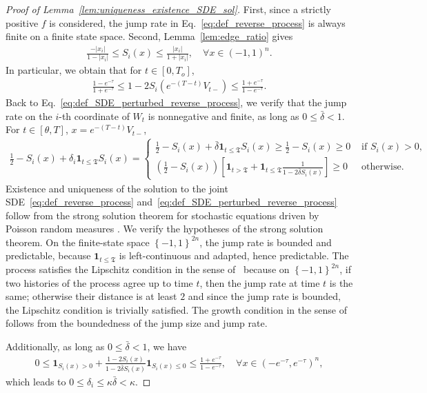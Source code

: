 \documentclass[11pt]{article}
\newcommand{\btau}{\kappa}
\newcommand{\bdelta}{\bar{\delta}}
\newcommand{\stopT}{{\boldsymbol{\mathfrak{T}}}}
\newcommand{\uV}{V}
\newcommand{\uW}{W}
\newcommand{\To}{{T_o}}
\theoremstyle{named}
\theoremstyle{plain}
\newcommand{\brackets}[1]{\left[ #1 \right]}
\newcommand{\parenth}[1]{\left( #1 \right)}
\newcommand{\braces}[1]{\left\{ #1 \right \}}
\newcommand{\abss}[1]{\left| #1 \right |}
\begin{document}
\begin{proof}[Proof of Lemma~\ref{lem:uniqueness_existence_SDE_sol}]
  First, since a strictly positive $f$ is considered, the jump rate in Eq.~\eqref{eq:def_reverse_process} is always finite on a finite state space. Second, Lemma~\ref{lem:edge_ratio} gives
\begin{align}
  \label{eq:score_bound}
  \frac{-\abss{x_i}}{1-\abss{x_i}} \leq S_i(x) \leq  \frac{\abss{x_i}}{1+\abss{x_i}}, \quad \forall x \in (-1, 1)^n.
\end{align}
In particular, we obtain that for $t \in [0, \To]$, 
\begin{align*}
  \frac{1-e^{-\tau}}{1+e^{-\tau}} \leq 1 - 2 S_i(e^{-(T-t)} \uV_{t-}) \leq \frac{1+e^{-\tau}}{1-e^{-\tau}}.
\end{align*}
Back to Eq.~\eqref{eq:def_SDE_perturbed_reverse_process}, we verify that the jump rate on the $i$-th coordinate of $\uW_t$ is nonnegative and finite, as long as $0 \leq \bdelta < 1$. For $t\in [\theta,T]$, $x = e^{-(T-t)} \uV_{t-}$,
\begin{align*}
  \frac{1}{2} - S_i(x) + \delta_i \mathbf{1}_{t \leq \stopT} S_i(x) = 
  \begin{cases}
    \displaystyle \frac{1}{2} - S_i(x) + \bdelta \mathbf{1}_{t \leq \stopT} S_i(x) \geq \frac{1}{2} - S_i(x) \geq 0 & \text{ if } S_i(x) > 0, \\
    \displaystyle \parenth{\frac{1}{2} - S_i(x)} \brackets{\mathbf{1}_{t > \stopT} + \mathbf{1}_{t \leq \stopT}\frac{1}{1-2\bdelta S_i(x)} }  \geq 0 & \text{ otherwise}.
  \end{cases}
\end{align*}
Existence and uniqueness of the solution to the joint SDE~\eqref{eq:def_reverse_process} and~\eqref{eq:def_SDE_perturbed_reverse_process} follow from the strong solution theorem for stochastic equations driven by Poisson random measures \cite[Chapter XIV, Definition 14.5 and Theorem 14.23]{jacod1979calcul}. We verify the hypotheses of the strong solution theorem. On the finite-state space $\braces{-1,1}^{2n}$, the jump rate is bounded and predictable, because $\mathbf{1}_{t \leq \stopT}$ is left-continuous and adapted, hence predictable. The process satisfies the Lipschitz condition in the sense of~\cite[Definition 14.14]{jacod1979calcul} because on $\braces{-1,1}^{2n}$, if two histories of the process agree up to time $t$, then the jump rate at time $t$ is the same; otherwise their distance is at least $2$ and since the jump rate is bounded, the Lipschitz condition is trivially satisfied. The growth condition in the sense of~\cite[Definition 14.22]{jacod1979calcul} follows from the boundedness of the jump size and jump rate.

Additionally, as long as $0 \leq \bdelta < 1$, we have
\begin{align*}
  0 \leq \mathbf{1}_{S_i(x) > 0} + \frac{1-2 S_i(x)}{1 - 2 \bdelta S_i(x)} \mathbf{1}_{S_i(x) \leq 0} \leq \frac{1+e^{-\tau}}{1-e^{-\tau}}, \quad \forall x \in (-e^{-\tau}, e^{-\tau})^n,
\end{align*}
which leads to $0 \leq \delta_i \leq \btau \bdelta < \btau$.
\end{proof}
\end{document}

